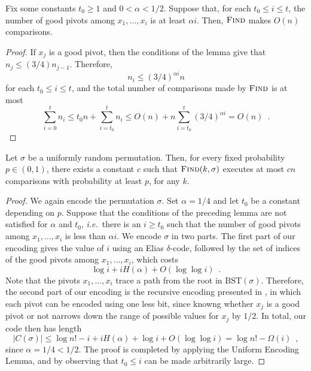 \documentclass[prodmode,acmcsur]{acmsmall}
\begin{document}
\begin{lem}
  Fix some constants $t_0 \geq 1$ and $0 < \alpha < 1/2$. Suppose
  that, for each $t_0 \leq i \leq t$, the number of good pivots among
  $x_1, \ldots, x_i$ is at least $\alpha i$. Then, $\textsc{Find}$
  makes $O(n)$ comparisons.
\end{lem}
\begin{proof}
  If $x_j$ is a good pivot, then the conditions of the lemma give
  that $n_j \le (3/4) n_{j - 1}$. Therefore,
  \[
  n_i \leq (3/4)^{\alpha i} n
  \]
  for each $t_0 \leq i \leq t$, and the total number of comparisons
  made by $\textsc{Find}$ is at most 
  \[
    \sum_{i=0}^t n_i \le t_0 n + \sum_{i=t_0}^t n_i \le O(n) + n
    \sum_{i = t_0}^t (3/4)^{\alpha i} = O(n) \enspace . %
  \]
\end{proof}

\begin{thm}
  Let $\sigma$ be a uniformly random permutation. Then, for 
  every fixed probability $p \in (0,1)$, there exists
  a constant $c$ such that 
  $\textsc{Find}(k, \sigma)$ executes at most $cn$ comparisons with 
  probability at least $p$, for any $k$.
\end{thm}
\begin{proof}
  We again encode the permutation $\sigma$. Set $\alpha = 1/4$ and
  let $t_0$ be a constant depending on $p$. Suppose that the
  conditions of the preceding lemma are not satisfied for $\alpha$ and 
  $t_0$,
  \emph{i.e.}~there is an $i \geq t_0$ such that the number of good pivots
  among $x_1, \dots, x_i$ is less than $\alpha i$. We encode $\sigma$
  in two parts. The first part of our encoding gives the value of $i$
  using an Elias $\delta$-code, followed by the set of indices of the
  good pivots among $x_1, \dots, x_i$, which costs
  \[
  \log i + i H(\alpha) + O(\log \log i) \enspace .
  \]
  Note that the pivots $x_1, \dots, x_i$ trace a path from the root in
  $\text{BST}(\sigma)$. Therefore, the second part of our encoding is
  the recursive encoding presented in , in which each
  pivot can be encoded using one less bit, since
  knowng whether $x_j$ is a good pivot or not narrows down
  the range of possible values for $x_j$ by $1/2$. In total, our code 
  then has length
  \[
    |C(\sigma)| \le \log n! - i + i H(\alpha) + \log i + O(\log \log
    i) = \log n! - \varOmega(i) \enspace ,
  \]
  since $\alpha = 1/4 < 1/2$. The proof is completed by applying 
  the Uniform
  Encoding Lemma, and by observing that $t_0 \leq i$ can be made
  arbitrarily large.
\end{proof}
\end{document}
